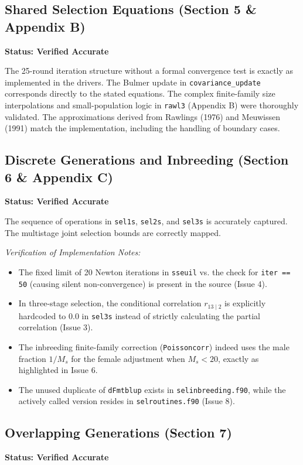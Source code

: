 \documentclass[11pt]{article}
\newcommand{\src}[1]{\texttt{#1}}
\begin{document}
\subsection{Shared Selection Equations (Section 5 \& Appendix B)}
\textbf{Status: Verified Accurate}

The 25-round iteration structure without a formal convergence test is exactly as implemented in the drivers. 
The Bulmer update in \src{covariance\_update} corresponds directly to the stated equations. 
The complex finite-family size interpolations and small-population logic in \src{rawl3} (Appendix B) were thoroughly validated. The approximations derived from Rawlings (1976) and Meuwissen (1991) match the implementation, including the handling of boundary cases.

\subsection{Discrete Generations and Inbreeding (Section 6 \& Appendix C)}
\textbf{Status: Verified Accurate}

The sequence of operations in \src{sel1s}, \src{sel2s}, and \src{sel3s} is accurately captured. The multistage joint selection bounds are correctly mapped.

\emph{Verification of Implementation Notes:}
\begin{itemize}
    \item The fixed limit of 20 Newton iterations in \src{sseuil} vs. the check for \src{iter == 50} (causing silent non-convergence) is present in the source (Issue 4).
    \item In three-stage selection, the conditional correlation $r_{13\mid2}$ is explicitly hardcoded to 0.0 in \src{sel3s} instead of strictly calculating the partial correlation (Issue 3).
    \item The inbreeding finite-family correction (\src{Poissoncorr}) indeed uses the male fraction $1/M_s$ for the female adjustment when $M_s < 20$, exactly as highlighted in Issue 6.
    \item The unused duplicate of \src{dFmtblup} exists in \src{selinbreeding.f90}, while the actively called version resides in \src{selroutines.f90} (Issue 8).
\end{itemize}

\subsection{Overlapping Generations (Section 7)}
\textbf{Status: Verified Accurate}
\end{document}
